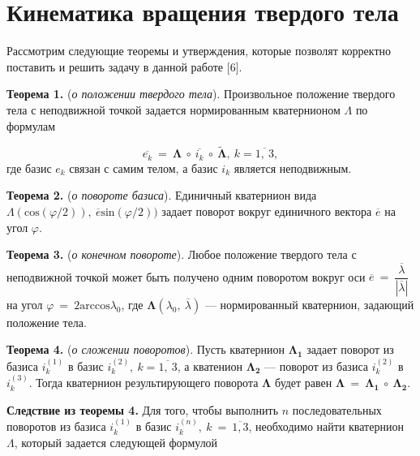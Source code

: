 \documentclass[14pt]{extreport}
\begin{document}
\newpage

\chapter{Кинематика вращения твердого тела}

Рассмотрим следующие теоремы и утверждения, которые позволят корректно поставить и решить задачу в данной работе [6].

\textbf{Теорема 1.} (\textit{о положении твердого тела}). Произвольное положение твердого тела с
неподвижной точкой задается нормированным кватернионом $\Lambda$ по формулам

\begin{equation}
 \overline{e_k}\ =\ \boldsymbol\Lambda\ \circ\ \overline{i_{k}}\ \circ\ \boldsymbol{\widetilde{\Lambda}},\ k = \overline{1,\ 3},
\end{equation}
где базис $e_k$ связан с самим телом, а базис $i_k$ является неподвижным.
\newline

\textbf{Теорема 2.} (\textit{о повороте базиса}). Единичный кватернион вида $\Lambda(\textrm{cos}(\varphi/2)),\ \overline{e} \textrm{sin}(\varphi/2))$
задает поворот вокруг единичного вектора $\overline{e}$ на угол $\varphi$.
\newline

\textbf{Теорема 3.} (\textit{о конечном повороте}). Любое положение твердого тела с неподвижной точкой может быть получено
одним поворотом вокруг оси $\overline{e}\ =\ \dfrac{\overline{\lambda}}{|\overline{\lambda}|}$ на угол $\varphi\ =\ \textrm{2arccos}\lambda_0$,
где $\boldsymbol\Lambda(\lambda_0,\ \overline{\lambda})$ --- нормированный кватернион, задающий положение тела.
\newline

\textbf{Теорема 4.} (\textit{о сложении поворотов}). Пусть кватернион $\boldsymbol{\Lambda_1}$ задает поворот из базиса $i^{(1)}_k$
в базис $i^{(2)}_k,\ k = \overline{1,\ 3}$, а кватенион $\boldsymbol{\Lambda_2}$ --- поворот из базиса $i^{(2)}_k$ в $i^{(3)}_k$.
Тогда кватернион результирующего поворота $\boldsymbol\Lambda$ будет равен $\boldsymbol\Lambda\ =\ \boldsymbol{\Lambda_1}\ \circ\ \boldsymbol{\Lambda_2}$.
\newline

\textbf{Следствие из теоремы 4.} Для того, чтобы выполнить $n$ последовательных поворотов из базиса $i^{(1)}_k$ 
в базис $i^{(n)}_k,\ k\ =\ \overline{1, 3}$, необходимо найти кватернион $\Lambda$, который задается следующей формулой
\end{document}
